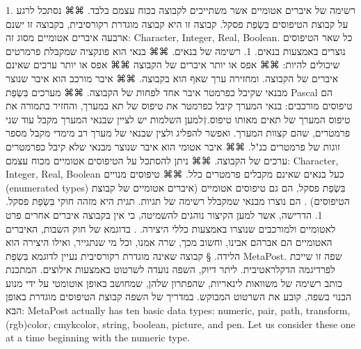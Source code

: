       1. רשימה של איברים אטומיים אשר משתייכים לקבוצה בכוח עצמם בלבד.
      ⌘⌘ נסתכל לרגע על קבוצת הטיפוסים בִּשְׂפַת פסקל. קבוצה זו היא קבוצה מוגדרת רקורסיבית, בקבוצה זו ישנם ארבעה איברים אטומיים מסוג זה: Character, Integer, Real, Boolean. כל שאר הטיפוסים נוצרים באמצעות בנאים.
      1. רשימה של בנאים.
      ⌘⌘ בנאי הוא פונקציה שמקבלת פרמרטים שיכולים להיות:
      ⌘⌘ אפס או יותר איברים של הקבוצה
      ⌘⌘ אפס או יותר ערכים שאינם איברים של הקבוצה.
      ומחזירה ערך שאף הוא בקבוצה.
      ⌘⌘ איבר מורכב הוא איבר שנוצר מבנאי שקיבל כפרמטר איבר אחד לפחות של הקבוצה.
      ⌘⌘ מערכים בִּשְׂפַת Pascal הם טיפוסים מורכבים: בנאי המערך קיבל כפרמטר את טיפוס של תא במערך, והחזיר בתמורה את טיפוס המערך של תאים מאותו טיפוס.†{למען השלמות יש לציין שבנאי המערך מקבל עוד שני פרמטרים, שהם קצוות המערך. ואפשר להפליג ולצין שבנאי של מערך רב מימדי מקבל מספר זוגות של פרמטרים כנ"ל.}
      ⌘⌘ איבר אטומי הוא איבר שנוצר מבנאי שלא קיבל כפרמטרים ערכים של הקבוצה.
      ⌘⌘ ניתן להסתכל על הטיפוסים אטומיים מכוח עצמם: Character, Integer, Real, Boolean כעל בנאים שאינם מקבלים פרמטרים כלל.
      ⌘⌘ טיפוסים מנויים (enumerated types) בִּשְׂפַת פסקל, הם גם טיפוסים אטומיים (איברים אטומיים של קבוצת הטיפוסים) . הם נוצרו מבנאי שמקבלל רשימה של תגיות. תגית היא מזהה חוקי בִּשְׂפַת פסקל.
      1. הדרישה, אשר למען הקיצור נוהגים להשמיטה, כי אין בקבוצה איברים אחרים פרט לאטומיים ולמורכבים שנוצרו באמצעות כללי היצירה. .
      בדוגמא של חוק השבות, האיברים האטומיים הם אברהם אבינו, וחשוב מכך, שרה אמנו, וכל מי שנתגייר, ואילו היצירה הוא הלידה.
      § קבוצה שאינה מוגדרת רקורסיבית
      נעיין לדוגמא בִּשְׂפַת MetaPost. שפה זו שייכת לפרדיגמה הדקלראטיבית. ליתר דיוק, השפה נועדה לשרטוט באמצעות אילוצים. המתכנת כותב רשימה של משוואות לינאריות, שהפתרון שלהן, שמחושב באופן אוטומטי על ידי מנוע הבנוי בשפה, קובע את השרטוט המבוקש.
      במדריך של השפה קבוצת הטיפוסים מוגדרת באופן הבא:
      MetaPost actually has ten basic data types: numeric, pair, path, transform, (rgb)color, cmykcolor, string, boolean, picture, and pen. Let us consider these one at a time beginning with the numeric type.
